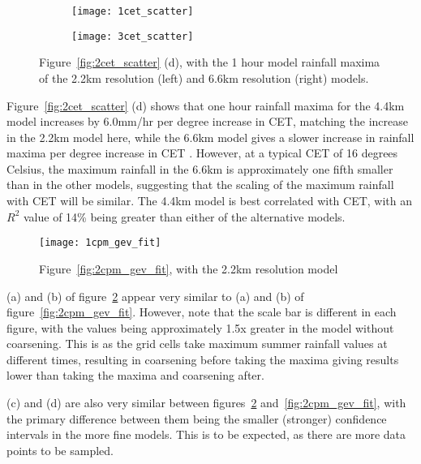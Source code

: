 \begin{figure}[H]
    \centering
    \begin{subfigure}{0.48\textwidth}
        \centering
        \texttt{[image: 1cet\_scatter]}
    \end{subfigure}
    \hfill
    \begin{subfigure}{0.48\textwidth}
        \centering
        \texttt{[image: 3cet\_scatter]}
    \end{subfigure}
    \caption[Figure~\ref{fig:2cet_scatter} with 2.2km and 6.6km fits.]{
        Figure~\ref{fig:2cet_scatter} (d), with the 1 hour model rainfall maxima of the 2.2km resolution (left) and 6.6km resolution (right) models.}
    \label{fig:13cet_scatter}
\end{figure}

Figure~\ref{fig:2cet_scatter} (d) shows that
    one hour rainfall maxima for the 4.4km model increases by 6.0mm/hr per degree increase in CET,
    matching the increase in the 2.2km model here,
    while the 6.6km model gives a slower increase in rainfall maxima per degree increase in CET .
However, at a typical CET of 16 degrees Celsius,
    the maximum rainfall in the 6.6km is approximately one fifth smaller than in the other models,
    suggesting that the scaling of the maximum rainfall with CET will be similar.
The 4.4km model is best correlated with CET, with an $R^2$ value of 14\% being greater than either of the alternative models.

\begin{figure}[H]
    \centering
    \texttt{[image: 1cpm\_gev\_fit]}
    \caption{Figure~\ref{fig:2cpm_gev_fit}, with the 2.2km resolution model}
    \label{fig:1cpm_gev_fit}
\end{figure}

(a) and (b) of figure~\ref{fig:1cpm_gev_fit} appear very similar to
    (a) and (b) of figure~\ref{fig:2cpm_gev_fit}.
However, note that the scale bar is different in each figure,
    with the values being approximately 1.5x greater in the model without coarsening.
This is as the grid cells take maximum summer rainfall values at different times,
    resulting in coarsening before taking the maxima giving results lower than taking the maxima and coarsening after.

(c) and (d) are also very similar between figures~\ref{fig:1cpm_gev_fit} and~\ref{fig:2cpm_gev_fit},
    with the primary difference between them being the smaller (stronger) confidence intervals in the more fine models.
This is to be expected, as there are more data points to be sampled.

